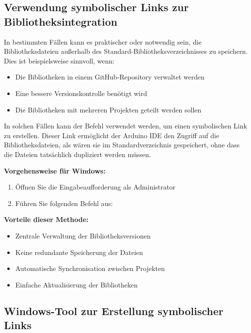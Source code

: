 \subsection{Verwendung symbolischer Links zur Bibliotheksintegration}

In bestimmten Fällen kann es praktischer oder notwendig sein, die Bibliotheksdateien außerhalb des Standard-Bibliotheksverzeichnisses zu speichern. Dies ist beispielsweise sinnvoll, wenn:

\begin{itemize}
	\item Die Bibliotheken in einem GitHub-Repository verwaltet werden
	\item Eine bessere Versionskontrolle benötigt wird
	\item Die Bibliotheken mit mehreren Projekten geteilt werden sollen
\end{itemize}

In solchen Fällen kann der Befehl  verwendet werden, um einen symbolischen Link zu erstellen. Dieser Link ermöglicht der Arduino IDE den Zugriff auf die Bibliotheksdateien, als wären sie im Standardverzeichnis gespeichert, ohne dass die Dateien tatsächlich dupliziert werden müssen.

\textbf{Vorgehensweise für Windows:}
\begin{enumerate}
	\item Öffnen Sie die Eingabeaufforderung als Administrator
	\item Führen Sie folgenden Befehl aus:
	
	\medskip
	
	
\end{enumerate}

\bigskip

\textbf{Vorteile dieser Methode:}
\begin{itemize}
	\item Zentrale Verwaltung der Bibliotheksversionen
	\item Keine redundante Speicherung der Dateien
	\item Automatische Synchronisation zwischen Projekten
	\item Einfache Aktualisierung der Bibliotheken
\end{itemize}


\subsection{Windows-Tool  zur Erstellung symbolischer Links}

